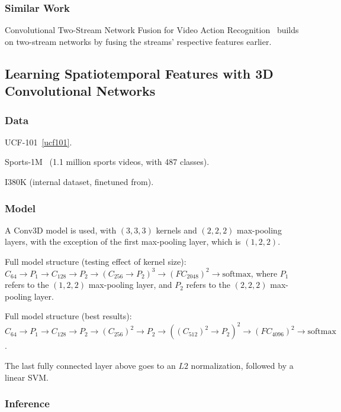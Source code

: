 \documentclass[a4paper, 12pt]{article}
\begin{document}
\subsubsection{Similar Work}

Convolutional Two-Stream Network Fusion for Video Action
Recognition~\citet{DBLP:journals/corr/FeichtenhoferPZ16} builds on two-stream
networks by fusing the streams' respective features earlier.


\subsection{Learning Spatiotemporal Features with 3D Convolutional
            Networks\citet{DBLP:journals/corr/TranBFTP14}}

\subsubsection{Data}

UCF-101~\ref{ucf101}.

Sports-1M~\citet{KarpathyCVPR14} (1.1 million sports videos, with 487 classes).

I380K (internal dataset, finetuned from).

\subsubsection{Model}

A Conv3D model is used, with $(3, 3, 3)$ kernels and $(2, 2, 2)$ max-pooling
layers, with the exception of the first max-pooling layer, which is
$(1, 2, 2)$.

Full model structure (testing effect of kernel size):
$C_{64} \rightarrow P_1 \rightarrow C_{128} \rightarrow P_2 \rightarrow
{(C_{256} \rightarrow P_2)}^3 \rightarrow {(FC_{2048})}^2 \rightarrow
\textrm{softmax}$, where $P_1$ refers to the $(1, 2, 2)$ max-pooling layer, and
$P_2$ refers to the $(2, 2, 2)$ max-pooling layer.

Full model structure (best results):
$C_{64} \rightarrow P_1 \rightarrow C_{128} \rightarrow P_2 \rightarrow
{(C_{256})}^2 \rightarrow P_2 \rightarrow
{({(C_{512})}^2 \rightarrow P_2)}^2 \rightarrow {(FC_{4096})}^2 \rightarrow
\textrm{softmax}$.

The last fully connected layer above goes to an $L2$ normalization, followed by
a linear SVM\@.

\subsubsection{Inference}
\end{document}
